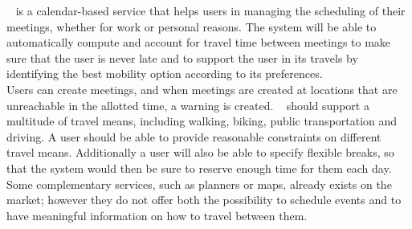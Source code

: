 \projectname~ is a calendar-based service that helps users in managing the scheduling of their meetings, whether for work or personal reasons. The system will be able to automatically compute and account for travel time between meetings to make sure that the user is never late and to support the user in its travels by identifying the best mobility option according to its preferences. \\
Users can create meetings, and when meetings are created at locations that are unreachable in the allotted time, a warning is created. \projectname~ should support a multitude of travel means, including walking, biking, public transportation and driving. A user should be able to provide reasonable constraints on different travel means. Additionally a user will also be able to specify flexible breaks, so that the system would then be sure to reserve enough time for them each day. \\
Some complementary services, such as planners or maps, already exists on the market; however they do not offer both the possibility to schedule events and to have meaningful information on how to travel between them.